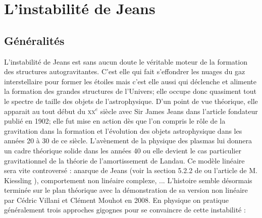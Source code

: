 \section{L'instabilit\'{e} de Jeans}

\subsection{Généralités}
L'instabilité de Jeans est sans aucun doute le véritable moteur de la formation des structures autogravitantes.
C'est elle qui fait s'effondrer les nuages du gaz interstellaire pour former les étoiles mais c'est elle aussi qui déclenche et alimente la formation des grandes structures de l'Univers; elle occupe donc quasiment tout le spectre de taille des objets de l'astrophysique. 
D'un point de vue théorique, elle apparait au tout début du \textsc{xx}$^e$ siècle avec Sir James Jeans dans l'article fondateur \cite{jeans02} publié en 1902; elle fut mise en action dès que l'on compris le rôle de la gravitation dans la formation et l'évolution  des objets astrophysique dans les années 20 à 30 de ce siècle. L'avènement de la physique des plasmas lui donnera un cadre théorique solide dans les années 40 ou elle devient le cas particulier gravitationnel de la théorie de l'amortissement de Landau. Ce modèle linéaire 
sera vite controversé  : anarque de Jeans (voir la section 5.2.2 de \cite{2008gady.book.....B}  ou l'article de M. Kiessling \cite{kiessling}), comportement non linéaire complexe, ... L'histoire semble désormais terminée sur le plan théorique avec la démonstration de sa version non linéaire par Cédric Villani et Clément Mouhot en 2008. En physique on pratique généralement trois approches gigognes pour se convaincre de cette instabilité : 
